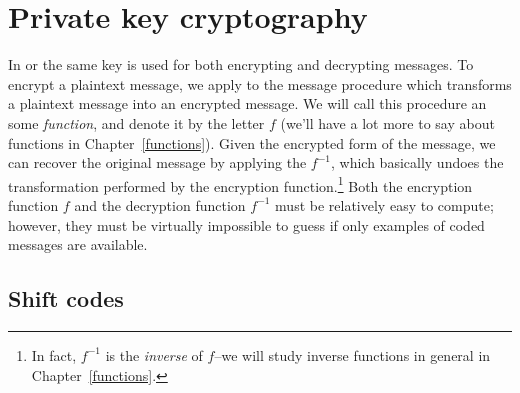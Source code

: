  
 
\section{Private key cryptography}
 
 
In  or
the same key is used for both encrypting and decrypting messages. To
encrypt a  plaintext message, we apply to the message procedure which transforms a  plaintext message into an encrypted message.  We will call this procedure an some \emph{function}, and denote it by the letter $f$ (we'll have a lot more to say about functions in Chapter~\ref{functions}).  Given the encrypted form of the message, we can recover the 
original message by applying the  $f^{-1}$, which basically undoes the transformation performed by the encryption function.\footnote{In fact, $f^{-1}$ is the \emph{inverse} of $f$--we will study inverse functions in general in Chapter~\ref{functions}.} Both the
encryption function $f$ and the decryption function $f^{-1}$ must be relatively easy to compute; however, they must be virtually impossible to guess if only
examples of coded messages are available.
 
\subsection{Shift codes} 
 
